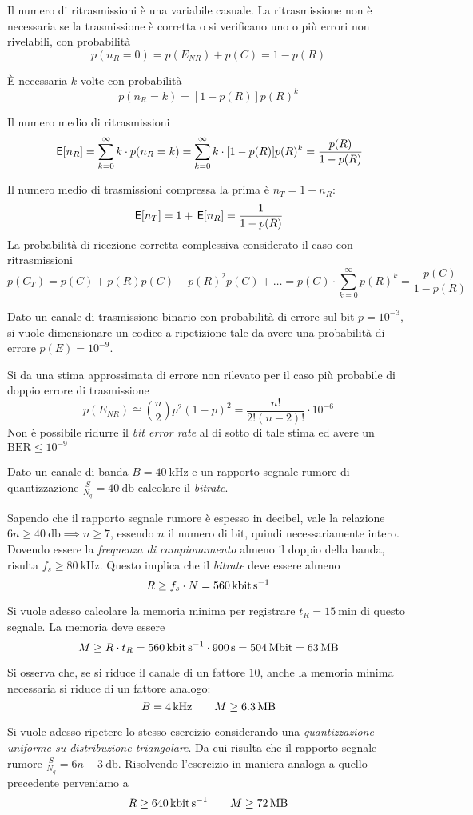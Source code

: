 Il numero di ritrasmissioni è una variabile casuale.
La ritrasmissione non è necessaria se la trasmissione è corretta o si verificano uno o più errori non rivelabili, con probabilità
\[
	p(n_R=0)=p(E_{NR})+p(C)=1-p(R)
\]

\`E necessaria $k$ volte con probabilità
\[
	p(n_R=k)=[1-p(R)]p(R)^k
\]

Il numero medio di ritrasmissioni
\[
	\,{\operatorname{\mathsf{E}}}\!\left[{n_R}\right]=\sum_{k=0}^{\infty}k\cdot p(n_R=k)=\sum_{k=0}^{\infty}k\cdot[1-p(R)]p(R)^k=\frac{p(R)}{1-p(R)}
\]

Il numero medio di trasmissioni compressa la prima è $n_T=1+n_R$:
\[
	\,{\operatorname{\mathsf{E}}}\!\left[{n_T}\right]=1+\,{\operatorname{\mathsf{E}}}\!\left[{n_R}\right]=\frac{1}{1-p(R)}
\]
La probabilità di ricezione corretta complessiva considerato il caso con ritrasmissioni
\[
	p(C_T)=p(C)+p(R)p(C)+p(R)^2p(C)+\dots=p(C)\cdot\sum_{k=0}^{\infty}p(R)^k=\frac{p(C)}{1-p(R)}
\]

\begin{esempio}
Dato un canale di trasmissione binario con probabilità di errore sul bit $p=10^{-3}$, si vuole dimensionare un codice a ripetizione tale da avere una probabilità di errore $p(E)=10^{-9}$.

Si da una stima approssimata di errore non rilevato per il caso più probabile di doppio errore di trasmissione
\[
	p(E_{NR})\cong\binom{n}{2}p^2(1-p)^2=\frac{n!}{2!(n-2)!}\cdot 10^{-6}
\]
Non è possibile ridurre il \emph{bit error rate} al di sotto di tale stima ed avere un $\text{BER}\leq 10^{-9}$
\end{esempio}

\begin{esercizio}
Dato un canale di banda $B = \SI{40}{\kHz}$ e un rapporto segnale rumore di quantizzazione $\frac{S}{N_q} = \SI{40}{\decibel}$ calcolare il \emph{bitrate}.

Sapendo che il rapporto segnale rumore è espesso in decibel, vale la relazione $6n \geq \SI{40}{\decibel} \implies n \geq 7$, essendo $n$ il numero di bit, quindi necessariamente intero. Dovendo essere la \emph{frequenza di campionamento} almeno il doppio della banda, risulta $f_s \geq \SI{80}{\kHz}$. Questo implica che il \emph{bitrate} deve essere almeno
\[
	R \geq f_s \cdot N = \SI{560}{\kilo\bit\per\second}
\]

Si vuole adesso calcolare la memoria minima per registrare $t_R = \SI{15}{\minute}$ di questo segnale. La memoria deve essere 
\[
	M \geq R \cdot t_R = \SI{560}{\kilo\bit\per\second} \cdot \SI{900}{\second} = \SI{504}{\mega\bit} = \SI{63}{\mega\byte}
\]

Si osserva che, se si riduce il canale di un fattore $10$, anche la memoria minima necessaria si riduce di un fattore analogo: 
\[
	B=\SI{4}{\kHz} \qquad M\geq\SI{6,3}{\mega\byte}
\]

Si vuole adesso ripetere lo stesso esercizio considerando una \emph{quantizzazione uniforme su distribuzione triangolare}. Da cui risulta che il rapporto segnale rumore $\frac{S}{N_q} = 6n-\SI{3}{\decibel}$. Risolvendo l'esercizio in maniera analoga a quello precedente perveniamo a 
\[
	R \geq \SI{640}{\kilo\bit\per\second} \qquad M \geq \SI{72}{\mega\byte}
\]
\end{esercizio}

